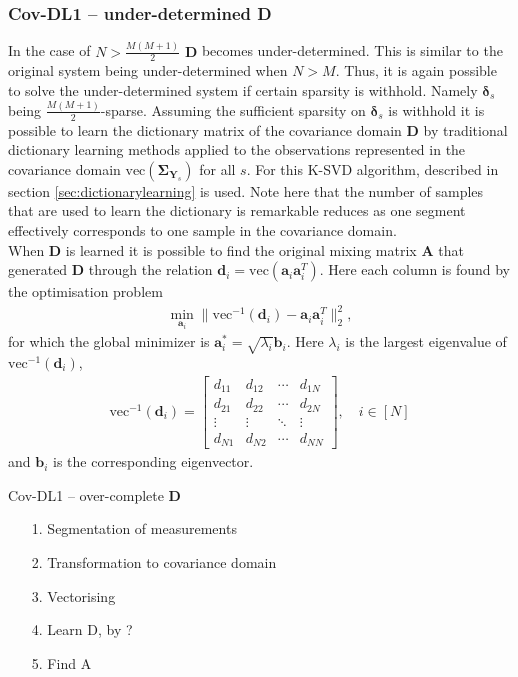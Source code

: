 \subsubsection*{Cov-DL1 -- under-determined \textbf{D}}
In the case of $N > \frac{M(M+1)}{2}$ $\textbf{D}$ becomes under-determined. This is  similar to the original system being under-determined when $N>M$. 
Thus, it is again possible to solve the under-determined system if certain sparsity is withhold. Namely $\boldsymbol{\delta}_s$ being $\frac{M(M+1)}{2}$-sparse.
Assuming the sufficient sparsity on $\boldsymbol{\delta}_s$ is withhold it is possible to learn the dictionary matrix of the covariance domain $\mathbf{D}$ by traditional dictionary learning methods applied to the observations represented in the covariance domain $\text{vec}(\boldsymbol{\Sigma}_{\mathbf{Y}_s})$ for all $s$.
For this K-SVD algorithm, described in section \ref{sec:dictionarylearning} is used. 
Note here that the number of samples that are used to learn the dictionary is remarkable reduces as one segment effectively corresponds to one sample in the covariance domain.  \\ 
When $\mathbf{D}$ is learned it is possible to find the original mixing matrix $\mathbf{A}$ that generated $\textbf{D}$ through the relation $\mathbf{d}_i = \text{vec}(\mathbf{a}_i \mathbf{a}_i^T)$. Here each column is found by the optimisation problem 
\begin{align*}
\min_{\textbf{a}_i} \| \text{vec}^{-1}(\textbf{d}_i) -\textbf{a}_i\textbf{a}_i^T\|_2^2, 
\end{align*}
for which the global minimizer is $\mathbf{a}^{\ast}_i=\sqrt{\lambda_i} \textbf{b}_i$. Here $\lambda_i$ is the largest eigenvalue of $\text{vec}^{-1}(\textbf{d}_i)$,
\begin{align*}
\text{vec}^{-1}(\textbf{d}_i) = 
\begin{bmatrix}
d_{11} & d_{12} & \cdots & d_{1N} \\
d_{21} & d_{22} & \cdots & d_{2N} \\
\vdots & \vdots & \ddots & \vdots \\
d_{N1} & d_{N2} & \cdots & d_{NN}
\end{bmatrix}, \quad i \in [N]
\end{align*}
and $\textbf{b}_i$ is the corresponding eigenvector.
  
  
\begin{algorithm}[H]
\caption{Cov-DL1 -- over-complete $\mathbf{D}$}
\begin{itemize}
\item[1.] Segmentation of measurements 
\item[2.] Transformation to covariance domain
\item[3.] Vectorising 
\item[4.] Learn D, by ?
\item[5.] Find A
\end{itemize}
\end{algorithm}

